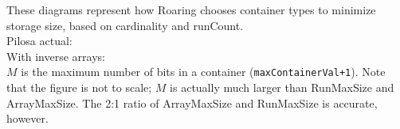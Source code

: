 \documentclass{article}
\begin{document}
These diagrams represent how Roaring chooses container types to minimize storage
size, based on cardinality and runCount.\\

Pilosa actual:\\


With inverse arrays:\\



$M$ is the maximum number of bits in a container (\texttt{maxContainerVal+1}).
Note that the figure is not to scale; $M$ is actually much larger than
RunMaxSize and ArrayMaxSize. The 2:1 ratio of ArrayMaxSize and RunMaxSize is
accurate, however.\\
\end{document}
